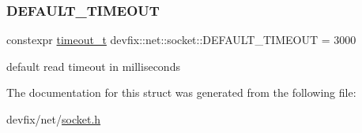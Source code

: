 \subsubsection{\texorpdfstring{D\+E\+F\+A\+U\+L\+T\+\_\+\+T\+I\+M\+E\+O\+UT}{DEFAULT\_TIMEOUT}}
{\footnotesize\ttfamily constexpr \hyperlink{structdevfix_1_1net_1_1socket_a80a3bf4cb7292bae31ea9c6575539c68}{timeout\+\_\+t} devfix\+::net\+::socket\+::\+D\+E\+F\+A\+U\+L\+T\+\_\+\+T\+I\+M\+E\+O\+UT = 3000\hspace{0.3cm}{\ttfamily [static]}}



default read timeout in milliseconds 



The documentation for this struct was generated from the following file\+:\begin{DoxyCompactItemize}
\item 
devfix/net/\hyperlink{socket_8h}{socket.\+h}\end{DoxyCompactItemize}
